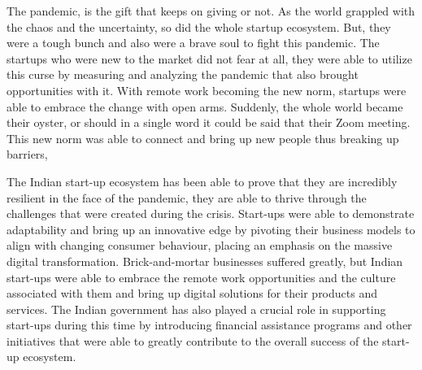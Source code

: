 \documentclass[12pt]{article}
\begin{document}
The pandemic, is the gift that keeps on giving or not. As the world grappled with the chaos and the uncertainty, so did the whole startup ecosystem. But, they were a tough bunch and also were a brave soul to fight this pandemic. The startups who were new to the market did not fear at all, they were able to utilize this curse by measuring and analyzing the pandemic that also brought opportunities with it. With remote work becoming the new norm, startups were able to embrace the change with open arms. Suddenly, the whole world became their oyster, or should in a single word it could be said that their Zoom meeting. This new norm was able to connect and bring up new people thus breaking up barriers,

The Indian start-up ecosystem has been able to prove that they are incredibly resilient in the face of the pandemic, they are able to thrive through the challenges that were created during the crisis. Start-ups 
were able to demonstrate adaptability and bring up an innovative edge by pivoting their business models to align with changing consumer behaviour, placing an emphasis on the massive digital transformation. Brick-and-mortar businesses suffered greatly, but Indian start-ups were able to 
embrace the remote work opportunities and the culture associated with them and bring up digital solutions for their products and services. The Indian government has also played a crucial role in supporting start-ups during this time by introducing financial assistance programs and other 
initiatives that were able to greatly contribute to the overall success of the start-up ecosystem. 
\end{document}
